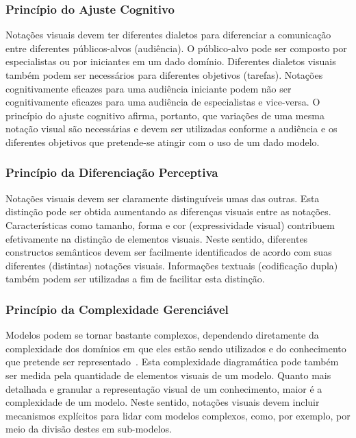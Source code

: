 \subsubsection{Princípio do Ajuste Cognitivo}\label{2-fundamentacao-notacao-visual-principio-ajuste-cognitivo}

Notações visuais devem ter diferentes dialetos para diferenciar a comunicação entre diferentes públicos-alvos (audiência). O público-alvo pode ser composto por especialistas ou por iniciantes em um dado domínio. Diferentes dialetos visuais também podem ser necessários para diferentes objetivos (tarefas). Notações cognitivamente eficazes para uma audiência iniciante podem não ser cognitivamente eficazes para uma audiência de especialistas e vice-versa. O princípio do ajuste cognitivo afirma, portanto, que variações de uma mesma notação visual são necessárias e devem ser utilizadas conforme a audiência e os diferentes objetivos que pretende-se atingir com o uso de um dado modelo.

\subsubsection{Princípio da Diferenciação Perceptiva}\label{2-fundamentacao-notacao-visual-principio-diferenciacao-perceptiva}

Notações visuais devem ser claramente distinguíveis umas das outras. Esta distinção pode ser obtida aumentando as diferenças visuais entre as notações. Características como tamanho, forma e cor (expressividade visual) contribuem efetivamente na distinção de elementos visuais. Neste sentido, diferentes constructos semânticos devem ser facilmente identificados de acordo com suas diferentes (distintas) notações visuais. Informações textuais (codificação dupla) também podem ser utilizadas a fim de facilitar esta distinção.

\subsubsection{Princípio da Complexidade Gerenciável}\label{2-fundamentacao-notacao-visual-principio-complexidade-gerenciavel}

Modelos podem se tornar bastante complexos, dependendo diretamente da complexidade dos domínios em que eles estão sendo utilizados e do conhecimento que pretende ser representado~\cite{MOODY-2009-Physics-Notation}. Esta complexidade diagramática pode também ser medida pela quantidade de elementos visuais de um modelo. Quanto mais detalhada e granular a representação visual de um conhecimento, maior é a complexidade de um modelo. Neste sentido, notações visuais devem incluir mecanismos explícitos para lidar com modelos complexos, como, por exemplo, por meio da divisão destes em sub-modelos.

